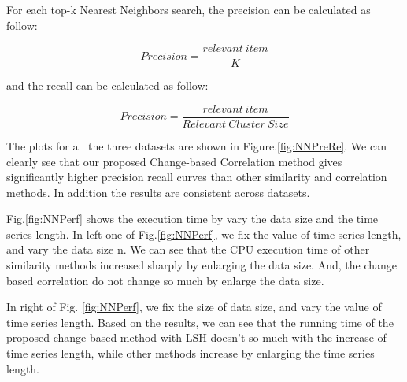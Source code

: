 For each top-k Nearest Neighbors search, the precision can be calculated as follow:

\begin{equation}
Precision =\frac{relevant~item}{K} 
\end{equation}

and the recall can be calculated as follow:

\begin{equation}
Precision =\frac{relevant~item}{Relevant~Cluster~Size} 
\end{equation}

The plots for all the three datasets are shown in Figure.\ref{fig:NNPreRe}.
We can clearly see that our proposed Change-based Correlation method gives significantly higher precision recall curves than other similarity and correlation methods. In addition the results are consistent across datasets.

Fig.\ref{fig:NNPerf} shows the execution time by vary the data size and the time series length.
In left one of Fig.\ref{fig:NNPerf}, we fix the value of time series length, and
vary the data size n. We can see that the CPU execution
time of other similarity methods increased sharply by enlarging the data size. 
And, the change based correlation do not change so much by enlarge the data size.

In right of Fig. \ref{fig:NNPerf}, we fix the size of data size, and vary the value of time series length. Based on the results, we can see that the running time of the proposed change based method with LSH doesn't so much with the increase of time series length, while other methods increase by enlarging the time series length.













